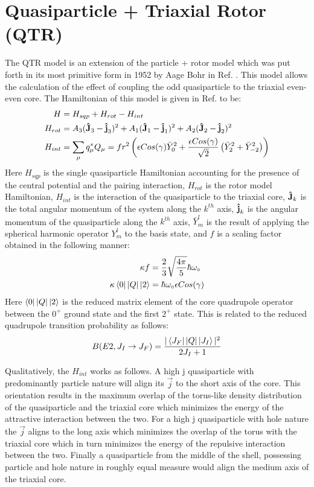\section{Quasiparticle + Triaxial Rotor (QTR)}
\label{sec:models-qtr}
The QTR model is an extension of the particle + rotor model which was put forth in its most primitive form in 1952 by Aage Bohr in Ref. \cite{bohrParticlePlusRotor}. This model allows the calculation of the effect of coupling the odd quasiparticle to the triaxial even-even core. The Hamiltonian of this model is given in Ref. \cite{frauendorfTransverseWobbling} to be:
\begin{align}
\label{eqn:chp2-qtr-hamil}
H&=H_{sqp}+H_{rot}-H_{int}\\
H_{rot}&=A_3(\boldsymbol{\hat{\textbf{J}}}_3-\boldsymbol{\hat{\textbf{j}}}_3)^2+A_1(\boldsymbol{\hat{\textbf{J}}}_1-\boldsymbol{\hat{\textbf{j}}}_1)^2+A_2(\boldsymbol{\hat{\textbf{J}}}_2-\boldsymbol{\hat{\textbf{j}}}_2)^2\\
H_{int}&= \sum\limits_{\mu}^{}q^*_{\mu}Q_{\mu} = f r^2 \left(\epsilon Cos(\gamma) \bar{Y}^2_0 + \frac{\epsilon Cos(\gamma)}{\sqrt{2}}\left(\bar{Y}^2_2 + \bar{Y}^2_{-2}\right)\right)
\end{align}
Here $H_{sqp}$ is the single quasiparticle Hamiltonian accounting for the presence of the central potential and the pairing interaction, $H_{rot}$ is the rotor model Hamiltonian, $H_{int}$ is the interaction of the quasiparticle to the triaxial core, $\boldsymbol{\hat{\textbf{J}}}_k$ is the total angular momentum of the system along the $k^{th}$ axis, $\boldsymbol{\hat{\textbf{j}}}_k$ is the angular momentum of the quasiparticle along the $k^{th}$ axis, $\bar{Y}^l_m$ is the result of applying the spherical harmonic operator $Y^l_m$ to the basis state, and $f$ is a scaling factor obtained in the following manner:
\begin{align}
\label{eqn:chp2-qtr-int-hamil-scaling}
\kappa f &= \frac{2}{3}\sqrt{\frac{4\pi}{5}}\hbar\omega_{\circ}\\
\kappa \Bra{0}|Q|\Ket{2} & = \hbar\omega_{\circ} \epsilon Cos(\gamma)
\end{align}
Here $\Bra{0}|Q|\Ket{2}$ is the reduced matrix element of the core quadrupole operator between the  $0^+$ ground state and the first $2^+$ state. This is related to the reduced quadrupole transition probability as follows:
\begin{equation}
\label{eqn:chp2-red-mat-el-to-red-trans-prob}
B(E2,J_I\rightarrow{}J_F)=\frac{|\Bra{J_F}|Q|\Ket{J_I}|^2}{2J_I+1}
\end{equation}

Qualitatively, the $H_{int}$ works as follows. A high j quasiparticle with predominantly particle nature will align its $\vec{j}$ to the short axis of the core. This orientation results in the maximum overlap of the torus-like density distribution of the quasiparticle and the triaxial core which minimizes the energy of the attractive interaction between the two. For a high j quasiparticle with hole nature the $\vec{j}$ aligns to the long axis which minimizes the overlap of the torus with the triaxial core which in turn minimizes the energy of the repulsive interaction between the two. Finally a quasiparticle from the middle of the shell, possessing particle and hole nature in roughly equal measure would align the medium axis of the triaxial core.

